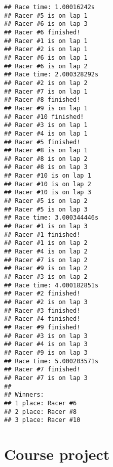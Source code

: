 \documentclass[]{book}
\begin{document}
\begin{verbatim}
## Race time: 1.00016242s
## Racer #5 is on lap 1
## Racer #6 is on lap 3
## Racer #6 finished!
## Racer #1 is on lap 1
## Racer #2 is on lap 1
## Racer #6 is on lap 1
## Racer #6 is on lap 2
## Race time: 2.000328292s
## Racer #2 is on lap 2
## Racer #7 is on lap 1
## Racer #8 finished!
## Racer #9 is on lap 1
## Racer #10 finished!
## Racer #3 is on lap 1
## Racer #4 is on lap 1
## Racer #5 finished!
## Racer #8 is on lap 1
## Racer #8 is on lap 2
## Racer #8 is on lap 3
## Racer #10 is on lap 1
## Racer #10 is on lap 2
## Racer #10 is on lap 3
## Racer #5 is on lap 2
## Racer #5 is on lap 3
## Race time: 3.000344446s
## Racer #1 is on lap 3
## Racer #1 finished!
## Racer #1 is on lap 2
## Racer #4 is on lap 2
## Racer #7 is on lap 2
## Racer #9 is on lap 2
## Racer #3 is on lap 2
## Race time: 4.000182851s
## Racer #2 finished!
## Racer #2 is on lap 3
## Racer #3 finished!
## Racer #4 finished!
## Racer #9 finished!
## Racer #3 is on lap 3
## Racer #4 is on lap 3
## Racer #9 is on lap 3
## Race time: 5.000203571s
## Racer #7 finished!
## Racer #7 is on lap 3
## 
## Winners:
## 1 place: Racer #6
## 2 place: Racer #8
## 3 place: Racer #10
\end{verbatim}

\hypertarget{course-project}{%
\chapter*{Course project}\label{course-project}}
\end{document}
